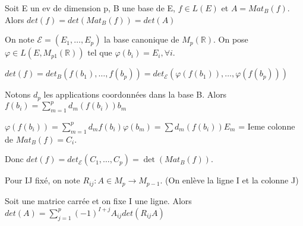 \documentclass[french]{yLectureNote}
\newcommand{\R}[0]{\mathbb{R}}
\newcommand{\tq}[0]{\text{ tel que }}
\newcommand{\mc}{\mathcal}
\begin{document}
\begin{theorem}
 Soit E un ev de dimension p, B une base de E, \(f\in L(E)\) et \(A = Mat_B(f)\). Alors \(det(f) = det(Mat_B(f)) = det(A)\)
\end{theorem}
\begin{myproof}
 On note \(\mc{E} = (E_1,\dots, E_p)\) la base canonique de \(M_p(\R)\). On pose \(\varphi \in L(E, M_{p1}(\R))\tq \varphi(b_i) = E_i,\forall i\).


 \(det(f) = det_B(f(b_1),\dots, f(b_p)) = det_{\mc{E}}(\varphi(f(b_1)),\dots, \varphi(f(b_p))) \)

 Notons \(d_p\) les applications coordonnées dans la base B. Alors \(f(b_i) = \sum_{m=1}^p d_m(f(b_i))b_m\)

 \(\varphi(f(b_i)) = \sum^p_{m=1}d_mf(b_i)\varphi(b_m) = \sum d_m(f(b_i))E_m\) = Ieme colonne de \(Mat_B(f) =C_i\).

 Donc \(det(f) = det_{\mc{E}}(C_1,\dots, C_p)  = \det(Mat_B(f))\).

%


\end{myproof}
Pour IJ fixé, on note \(R_{ij} : A \in M_p \to M_{p-1}\). (On enlève la ligne I et la colonne J)
\begin{proposition}
Soit une matrice carrée et on fixe I une ligne. Alors \(det(A) = \sum_{j=1}^p (-1)^{I+j}A_{ij}det(R_{ij}A)\)
\end{proposition}
\end{document}
